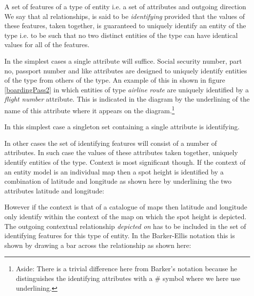 \mynote A set of features of a type of entity i.e. a set of attributes and outgoing direction We say that al relationships, is said to be \textit{identifying} provided that the values of these features,
taken together, is guaranteed to uniquely identify an entity of the type i.e. to be such that no two distinct entities of the type can have identical values for all of the features. 

\mynote In the simplest cases a single attribute will suffice. Social security number, part no, 
passport number and like attributes are designed to uniquely identify entities of the type from others of the type. 
An example of this 
in  shown in figure \ref{boardingPass2} in which entities of type \textit{airline route} are uniquely identified by a \textit{flight number} attribute.
This is
indicated in the diagram  by the underlining of the name of this attribute where it appears on the diagram.\footnote{Aside: There is a trivial difference here from Barker's notation because he distinguishes the identifying attributes with a \# symbol where we here use  underlining.} 

\mynote In this simplest case  a singleton set containing a single attribute is identifying.

\mynote In other cases the set of identifying features will consist of a number of attributes. In such case  the values of these attributes taken together, uniquely identify entities of the type. Context is most significant though. 
If the context of an entity model is an individual map then a spot height is identified by a combination of latitude and longitude as shown here by underlining the two attributes latitude and longitude: 

\begin{center}

\end{center}

However if the context is that of a catalogue of maps then latitude and longitude only identify within the context of the map on which the spot height is depicted. The outgoing contextual relationship \textit{depicted on}
has to be included in the set of identifying features for this type of entity. In the Barker-Ellis notation this is shown by drawing a bar across the relationship as shown here:  

\begin{center}

\end{center}


